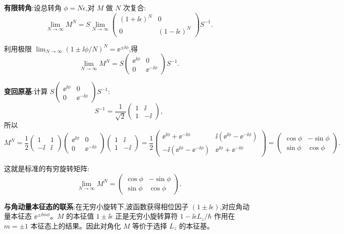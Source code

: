 \begin{question}
\begin{solution}
	\textbf{有限转角}:设总转角 $\phi=N\epsilon$,对 $M$ 做 $N$ 次复合:
	\[
	\lim_{N\to\infty}M^N
	= S\lim_{N\to\infty}\begin{pmatrix}(1+\ii\epsilon)^N&0\\0&(1-\ii\epsilon)^N\end{pmatrix}S^{-1}.
	\]

	利用极限 $\lim_{N\to\infty}(1\pm\ii\phi/N)^N=\ee^{\pm\ii\phi}$,得
	\[
	\lim_{N\to\infty}M^N = S\begin{pmatrix}\ee^{\ii\phi}&0\\0&\ee^{-\ii\phi}\end{pmatrix}S^{-1}.
	\]

	\textbf{变回原基}:计算 $S\begin{pmatrix}\ee^{\ii\phi}&0\\0&\ee^{-\ii\phi}\end{pmatrix}S^{-1}$:
	\[
	S^{-1}=\frac{1}{\sqrt{2}}\begin{pmatrix}1&\ii\\1&-\ii\end{pmatrix},
	\]
	所以
	\[
	M^N = \frac12\begin{pmatrix}1&1\\-\ii&\ii\end{pmatrix}
	\begin{pmatrix}\ee^{\ii\phi}&0\\0&\ee^{-\ii\phi}\end{pmatrix}
	\begin{pmatrix}1&\ii\\1&-\ii\end{pmatrix}
	=\frac12\begin{pmatrix}\ee^{\ii\phi}+\ee^{-\ii\phi}&\ii(\ee^{\ii\phi}-\ee^{-\ii\phi})\\
	-\ii(\ee^{\ii\phi}-\ee^{-\ii\phi})&\ee^{\ii\phi}+\ee^{-\ii\phi}\end{pmatrix}
	=\begin{pmatrix}\cos\phi&-\sin\phi\\ \sin\phi&\cos\phi\end{pmatrix}.
	\]

	这就是标准的有穷旋转矩阵:
	\[
	\boxed{\lim_{N\to\infty}M^N = \begin{pmatrix}\cos\phi&-\sin\phi\\ \sin\phi&\cos\phi\end{pmatrix}}.
	\]

	\textbf{与角动量本征态的联系}:在无穷小旋转下,波函数获得相位因子 $(1\pm\ii\epsilon)$,对应角动量本征态 $\ee^{\pm\ii m\phi}$。$M$ 的本征值 $1\pm\ii\epsilon$ 正是无穷小旋转算符 $1-\ii\epsilon L_z/\hbar$ 作用在 $m=\pm1$ 本征态上的结果。因此对角化 $M$ 等价于选择 $L_z$ 的本征基。
	\end{solution}
\end{question}

